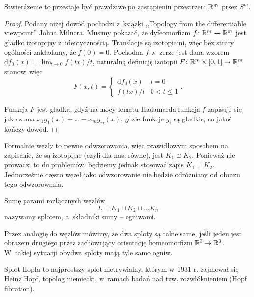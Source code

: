Stwierdzenie to przestaje być prawdziwe po zastąpieniu przestrzeni $\mathbb R^m$ przez $S^m$.

\begin{proof}
%
    Podany niżej dowód pochodzi z~książki ,,Topology from the differentiable viewpoint'' Johna Milnora.
    Musimy pokazać, że dyfeomorfizm $f \colon \mathbb R^m \to \mathbb R^m$ jest gładko izotopijny z~identycznością.
    Translacje są izotopiami, więc bez straty ogólności zakładamy, że $f(0) = 0$.
    Pochodna $f$ w~zerze jest dana wzorem $\mathrm{d}f_0(x) = \lim_{t \to 0} f(tx) /t$,
    naturalną definicję izotopii $F \colon \mathbb R^m \times [0, 1] \to \mathbb R^m$ stanowi więc
    \begin{equation}
        F(x, t) = \begin{cases}
            \mathrm{d}f_0(x) & t = 0 \\
            f(tx) / t & 0 < t \le 1
        \end{cases} .
    \end{equation}

    Funkcja $F$ jest gładka, gdyż na mocy lematu Hadamarda funkcja $f$ zapisuje się jako suma $x_1 g_1(x) + \ldots + x_mg_m(x)$, gdzie funkcje $g_i$ są gładkie, co jakoś kończy dowód.
\end{proof}

Formalnie węzły to pewne odwzorowania, więc prawidłowym sposobem na zapisanie, że są izotopijne (czyli dla nas: równe), jest $K_1 \cong K_2$.
Ponieważ nie prowadzi to do problemów, będziemy jednak stosować zapis $K_1 = K_2$.
Jednocześnie często węzeł jako odwzorowanie nie będzie odróżniany od obrazu tego odwzorowania.

\begin{definition}
%
\label{def:link}%
    Sumę parami rozłącznych węzłów
    \begin{equation}
        L = K_1 \sqcup K_2 \sqcup \ldots K_n
    \end{equation}
    nazywamy splotem, a~składniki sumy -- ogniwami.
\end{definition}

Przez analogię do węzłów mówimy, że dwa sploty są takie same, jeśli jeden jest obrazem drugiego przez zachowujący orientację homeomorfizm $\mathbb R^3 \to \mathbb R^3$.
W~takiej sytuacji obydwa sploty mają tyle samo ogniw.

\begin{example}
%
%
    Splot Hopfa to najprostszy splot nietrywialny, którym w~1931 r. zajmował się Heinz Hopf, topolog niemiecki, w~ramach badań nad tzw. rozwłóknieniem (Hopf fibration).
\end{example}

